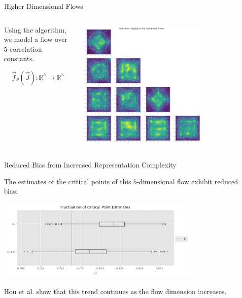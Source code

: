 \documentclass[aspectratio=169, 12pt]{beamer}
\begin{document}
\begin{frame}{Higher Dimensional Flows}

    \begin{columns}
        \begin{column}{.4\textwidth}
            
            Using the algorithm, we model a flow over $5$ correlation constants. 

            \[
            \vec{f}_\theta(\vec{J}) : \mathbb{R}^5 \rightarrow \mathbb{R}^5
            \]
            
        \end{column}
        \begin{column}{.6\textwidth}
            \begin{center}
                \includegraphics[width=0.7\textwidth]{images/a1e-flows.png}
            \end{center}
        \end{column}
    \end{columns}
    
\end{frame}

\begin{frame}{Reduced Bias from Increased Representation Complexity}

    The estimates of the critical points of this $5$-dimensional flow exhibit reduced bias:
    
    \begin{center}
        \includegraphics[width=0.75\textwidth]{images/a1-a1e-critical-points-boxplot.png}
    \end{center}

    Hou et al. show that this trend continues as the flow dimension increases. 

\end{frame}
\end{document}
